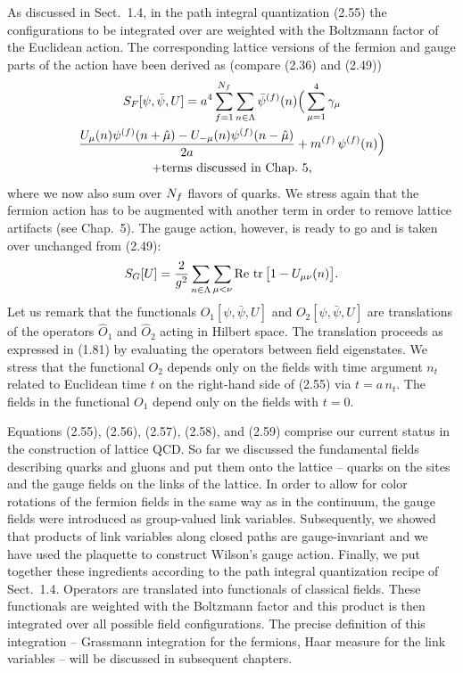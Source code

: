 As discussed in Sect.~1.4, in the path integral quantization (2.55) the
configurations to be integrated over are weighted with the Boltzmann factor
of the Euclidean action. The corresponding lattice versions of the fermion
and gauge parts of the action have been derived as (compare (2.36) and
(2.49))
\begin{multline}
  S_F[\psi, \bar\psi, U] = a^4 \sum_{f=1}^{N_f}\sum_{n\in\Lambda}
    \bar\psi^{(f)}(n) \Big( \sum_{\mu=1}^{4} \gamma_\mu\\
    \frac{U_\mu(n)\psi^{(f)}(n + \hat\mu)
      - U_{-\mu}(n)\psi^{(f)}(n - \hat\mu)}{2a}
    + m^{(f)}\, \psi^{(f)}(n) \Big) \\
    + \text{terms discussed in Chap.~5} ,
\end{multline}
where we now also sum over $N_f$ flavors of quarks. We stress again that the
fermion action has to be augmented with another term in order to remove
lattice artifacts (see Chap.~5). The gauge action, however, is ready to go
and is taken over unchanged from (2.49):
\begin{equation}
  S_G[U] = \frac{2}{g^2} \sum_{n\in\Lambda} \sum_{\mu<\nu}
    \operatorname{Re}\, \operatorname{tr}\big[1 - U_{\mu\nu}(n)\big] .
\end{equation}
Let us remark that the functionals $O_1[\psi, \bar\psi, U]$ and
$O_2[\psi, \bar\psi, U]$ are translations of the operators $\hat{O}_1$ and
$\hat{O}_2$ acting in Hilbert space. The translation proceeds as expressed
in (1.81) by evaluating the operators between field eigenstates. We stress
that the functional $O_2$ depends only on the fields with time argument
$n_t$ related to Euclidean time $t$ on the right-hand side of (2.55) via
$t = a\, n_t$. The fields in the functional $O_1$ depend only on the fields
with $t = 0$.

Equations (2.55), (2.56), (2.57), (2.58), and (2.59) comprise our current
status in the construction of lattice QCD. So far we discussed the
fundamental fields describing quarks and gluons and put them onto the
lattice -- quarks on the sites and the gauge fields on the links of the
lattice. In order to allow for color rotations of the fermion fields in the
same way as in the continuum, the gauge fields were introduced as
group-valued link variables. Subsequently, we showed that products of link
variables along closed paths are gauge-invariant and we have used the
plaquette to construct Wilson's gauge action. Finally, we put together these
ingredients according to the path integral quantization recipe of Sect.~1.4.
Operators are translated into functionals of classical fields. These
functionals are weighted with the Boltzmann factor and this product is then
integrated over all possible field configurations. The precise definition of
this integration -- Grassmann integration for the fermions, Haar measure for
the link variables -- will be discussed in subsequent chapters.

